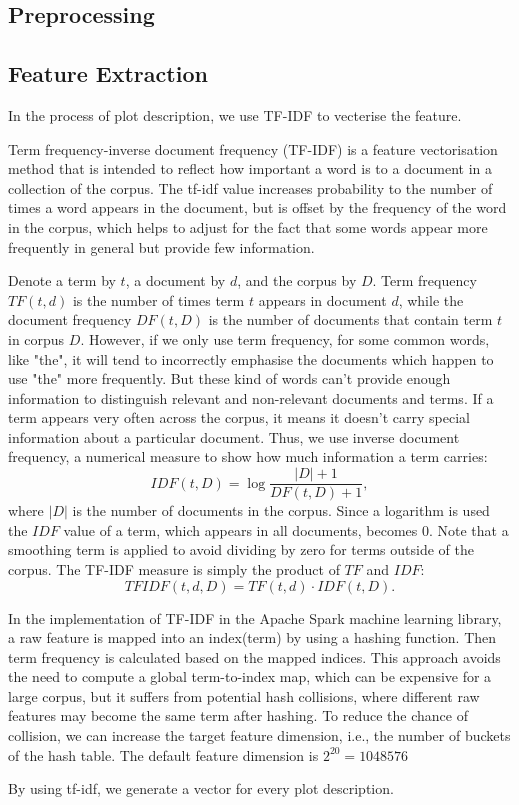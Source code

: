 \documentclass{vldb}
\begin{document}
\subsection{Preprocessing}


\subsection{Feature Extraction}
\par In the process of plot description, we use TF-IDF\cite{mining} to vecterise the feature.
\par Term frequency-inverse document frequency (TF-IDF) is a feature vectorisation method that is intended to reflect how important a word is to a document in a collection of the corpus. The tf-idf value increases probability to the number of times a word appears in the document, but is offset by the frequency of the word in the corpus, which helps to adjust for the fact that some words appear more frequently in general but provide few information.
\par Denote a term by $t$, a document by $d$, and the corpus by $D$. Term frequency $TF(t,d)$ is the number of times term $t$ appears in document $d$, while the document frequency $DF(t,D)$ is the number of documents that contain term $t$ in corpus $D$. However, if we only use term frequency, for some common words, like "the", it will tend to incorrectly emphasise the documents which happen to use "the" more frequently. But these kind of words can't provide enough information to distinguish relevant and non-relevant documents and terms. If a term appears very often across the corpus, it means it doesn't carry special information about a particular document. Thus, we use inverse document frequency, a numerical measure to show how much information a term carries:
\begin{displaymath}
IDF(t,D) = \log\frac{|D|+1}{DF(t,D)+1},
\end{displaymath}
where $|D|$ is the number of documents in the corpus. Since a logarithm is used the $IDF$ value of a term, which appears in all documents, becomes 0. Note that a smoothing term is applied to avoid dividing by zero for terms outside of the corpus. The TF-IDF measure is simply the product of $TF$ and $IDF$:
\begin{displaymath}
TFIDF(t,d,D)=TF(t,d)⋅IDF(t,D).
\end{displaymath} 
\par In the implementation of TF-IDF in the Apache Spark machine learning library, a raw feature is mapped into an index(term) by using a hashing function. Then term frequency is calculated based on the mapped indices. This approach avoids the need to compute a global term-to-index map, which can be expensive for a large corpus, but it suffers from potential hash collisions, where different raw features may become the same term after hashing. To reduce the chance of collision, we can increase the target feature dimension, i.e., the number of buckets of the hash table. The default feature dimension is $2^{20}=1048576$
\par By using tf-idf, we generate a vector for every plot description.
\end{document}
